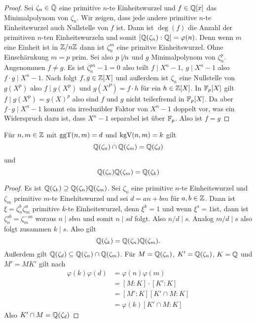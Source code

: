 \begin{proof}
    Sei \(\zeta_n\in\bar{\mathbb{Q}}\) eine primitive \(n\)-te Einheitswurzel und \(f\in\mathbb{Q}[x]\) das Minimalpolynom von \(\zeta_n\).
    Wir zeigen, dass jede andere primitive \(n\)-te Einheitswurzel auch Nullstelle von
     \(f\) ist. Dann ist \(
    \deg(f)\) die Anzahl der primitiven \(n\)-ten Einheitswurzeln und somit 
    \([\mathbb{Q}(\zeta_n):\mathbb{Q}]=\varphi(n)\).
    Denn wenn \(m\) eine Einheit ist in \(\mathbb{Z}/n\mathbb{Z}\) dann ist \(\zeta_n^m\) eine primitve Einheitswurzel.
    Ohne Einschärnkung \(m=p\) prim.
    Sei also \(p\not\mid n\) und \(g\) Minimalpolynom von \(\zeta_n^p\). Angenommen \(f\neq g\).
    Es ist \(\zeta_n^{pn}-1=0\) also teilt \(f\mid X^n-1,\ g\mid X^n-1\) also \(f\cdot g\mid X^n-1\). Nach  folgt \(f,g\in\mathbb{Z}[X]\) und außerdem ist \(\zeta_n\) eine Nullstelle von \(g(X^p)\) also \(f\mid g(X^p)\) und \(g(X^P)=f\cdot h\) für ein \(h\in \mathbb{Z}[X]\).
    In \(\mathbb{F}_p[X]\) gilt \(f\mid g(X^p)=g(X)^p\) also sind \(f\) und \(g\) nicht teilerfremd in \(\mathbb{F}_p[X]\). Da aber \(f\cdot g\mid X^n-1\) kommt ein irreduzibler Faktor von \(X^n-1\) doppelt vor, was ein Widerspruch dazu ist, dass \(X^n-1\) separabel ist über \(\mathbb{F}_p\).
    Also ist \(f=g\)
\end{proof}
\begin{Kor}
    Für \(n,m\in\mathbb{Z}\) mit \(\operatorname{ggT}(n,m)=d\) und \(\operatorname{kgV}(n,m)=k\) gilt \[\mathbb{Q}(\zeta_n)\cap \mathbb{Q}(\zeta_m)=\mathbb{Q}(\zeta_d)\] und \[\mathbb{Q}(\zeta_n)\mathbb{Q}(\zeta_m)=\mathbb{Q}(\zeta_k)\]
\end{Kor}
\begin{proof}
     Es ist \(\mathbb{Q}(\zeta_k)\supseteq\mathbb{Q}(\zeta_n)\mathbb{Q}(\zeta_m)\).
     Sei \(\zeta_n\) eine primitive \(n\)-te Einheitswurzel und \(\zeta_m\) primitive \(m\)-te Einehitswurzel und sei \(d=an+bm\) für \(a,b\in\mathbb{Z}\).
     Dann ist \(\xi=\zeta_n^b\zeta_m^a\) primitive \(k\)-te Einheitswurzel, denn \(\xi^k=1\) und wenn \(\xi^s=1\)ist, dann ist \(\zeta_n^{sb}=\zeta_m^{-sa}\) woraus \(n\mid sbm\) und somit \(n\mid sd\) folgt. Also \(n/d\mid s\). Analog \(m/d\mid s\) also folgt zusammen \(k\mid s\). Also gilt \[\mathbb{Q}(\zeta_k)=\mathbb{Q}(\zeta_n)\mathbb{Q}(\zeta_m).\] Außerdem gilt
     \(\mathbb{Q}(\zeta_d)\subseteq \mathbb{Q}(\zeta_n)\cap\mathbb{Q}(\zeta_m)\).
     Für \(M=\mathbb{Q}(\zeta_n)\), \(K'=\mathbb{Q}(\zeta_n)\), \(K=\mathbb{Q}\) und \(M'=MK'\) gilt nach 
     \begin{align*}
         \varphi(k)\varphi(d)&=\varphi(n)\varphi(m)\\
         &=[M:K]\cdot [K':K]\\
         &=[M':K][K'\cap M:K]\\
         &=\varphi(k)[K'\cap M:K]
    \end{align*}
     Also \(K'\cap M=\mathbb{Q}(\zeta_d)\)
\end{proof}
